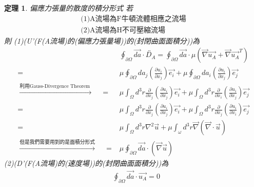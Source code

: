 \documentclass[12pt]{article}
\theoremstyle{upright}
\newtheorem{theorem}{定理}[section]
\begin{document}
\begin{theorem} 偏應力張量的散度的積分形式
\noindent 若
\[
\begin{array}{l}
    \text{(1)A流場為F牛頓流體相應之流場}\\
    \text{(2)A流場為H不可壓縮流場}
\end{array}
\]
\noindent 則
\noindent
(1)\quad(U'(F(A流場)的(偏應力張量場))的(封閉曲面面積分))為
\begin{equation}\begin{aligned}
    &\oint_{\partial \Omega} \vec{da}\cdot \overleftrightarrow{D_A} = \oint_{\partial \Omega} \vec{da}\cdot \mu (\vec{\nabla}\vec{u_A} + \vec{\nabla}\vec{u_A}^{T})\\[1.5ex]
    =&\mu \oint_{\partial \Omega} da_{j}\left(\frac{\partial u_{i}}{\partial x_{j}}\right)\vec{e_{i}}  + \mu\oint_{\partial \Omega }da_{i}\left(\frac{\partial u_{i}}{\partial x_{j}}\right)\vec{e_{j}} 
    \\[1.5ex]\xrightarrow{\text{利用Gauss-Divergence Theorem }}\quad =& \mu \int_{\Omega} d^3r \frac{\partial }{\partial x_{j}}\left(\frac{\partial u_{i}}{\partial x_{j}}\right)\vec{e_{i}} + \mu \int_{\Omega} d^3r \frac{\partial }{\partial x_{i}} \left(\frac{\partial u_{i}}{\partial x_{j}}\right)\vec{e_{j}} \\[1.5ex] 
    =& \mu \int_{\Omega} d^3r \frac{\partial }{\partial x_{j}}\left(\frac{\partial u_{i}}{\partial x_{j}}\right)\vec{e_{i}} + \mu \int_{\Omega} d^3r \frac{\partial }{\partial x_{j}} \left(\frac{\partial u_{i}}{\partial x_{i}}\right)\vec{e_{j}} \\[1.5ex] 
     =& \mu \int_{\Omega} d^3r \nabla^2{\vec{u}} + \mu \int_{\omega} d^3r \vec{\nabla } \left(\vec{\nabla }\cdot \vec{u}\right) \\[1.5ex]
    \xrightarrow{\text{但是我們需要用到的是面積分形式}}  \quad  =&\mu  \oint_{\partial \Omega} \vec{da} \cdot \left(\vec{\nabla}\vec{u}\right)
\end{aligned}\end{equation}
(2)\quad (D'(F(A流場)的(速度場))的(封閉曲面面積分))為
\begin{equation}\begin{aligned}
    &\oint_{\partial \Omega} \vec{da}\cdot \vec{u_{A}} = 0 \\[1.5ex] 
\end{aligned}\end{equation} 
\end{theorem}
 
\end{document}
